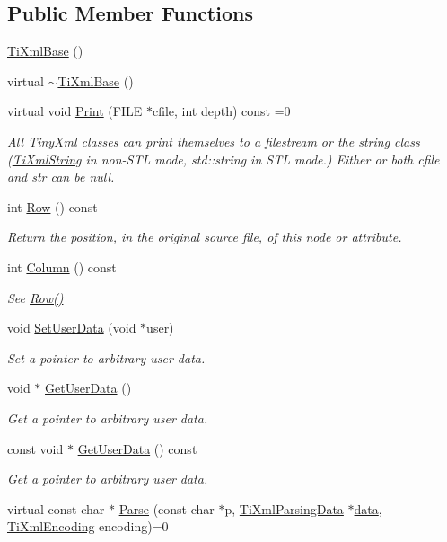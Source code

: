 \subsection*{Public Member Functions}
\begin{DoxyCompactItemize}
\item 
\hyperlink{class_ti_xml_base_ac6753fe8a2c89669038fcf281cb301bf}{TiXmlBase} ()
\item 
virtual \hyperlink{class_ti_xml_base_ad1837ecb25a913612fa1115f090cbb56}{$\sim$TiXmlBase} ()
\item 
virtual void \hyperlink{class_ti_xml_base_a0de56b3f2ef14c65091a3b916437b512}{Print} (FILE $\ast$cfile, int depth) const =0
\begin{DoxyCompactList}\small\item\em All TinyXml classes can print themselves to a filestream or the string class (\hyperlink{class_ti_xml_string}{TiXmlString} in non-\/STL mode, std::string in STL mode.) Either or both cfile and str can be null. \end{DoxyCompactList}\item 
int \hyperlink{class_ti_xml_base_a024bceb070188df92c2a8d8852dd0853}{Row} () const 
\begin{DoxyCompactList}\small\item\em Return the position, in the original source file, of this node or attribute. \end{DoxyCompactList}\item 
int \hyperlink{class_ti_xml_base_ab54bfb9b70fe6dd276e7b279cab7f003}{Column} () const 
\begin{DoxyCompactList}\small\item\em See \hyperlink{class_ti_xml_base_a024bceb070188df92c2a8d8852dd0853}{Row()} \end{DoxyCompactList}\item 
void \hyperlink{class_ti_xml_base_ac6b3e0f790930d4970ec30764e937b5d}{SetUserData} (void $\ast$user)
\begin{DoxyCompactList}\small\item\em Set a pointer to arbitrary user data. \end{DoxyCompactList}\item 
void $\ast$ \hyperlink{class_ti_xml_base_a6559a530ca6763fc301a14d77ed28c17}{GetUserData} ()
\begin{DoxyCompactList}\small\item\em Get a pointer to arbitrary user data. \end{DoxyCompactList}\item 
const void $\ast$ \hyperlink{class_ti_xml_base_ad0120210e4680ef2088601753ce0ede4}{GetUserData} () const 
\begin{DoxyCompactList}\small\item\em Get a pointer to arbitrary user data. \end{DoxyCompactList}\item 
virtual const char $\ast$ \hyperlink{class_ti_xml_base_a00e4edb0219d00a1379c856e5a1d2025}{Parse} (const char $\ast$p, \hyperlink{class_ti_xml_parsing_data}{TiXmlParsingData} $\ast$\hyperlink{bootstrap_8cc_a923b2158227405b9f7a6eceb6c7104c8}{data}, \hyperlink{tinyxml_8h_a88d51847a13ee0f4b4d320d03d2c4d96}{TiXmlEncoding} encoding)=0
\end{DoxyCompactItemize}
